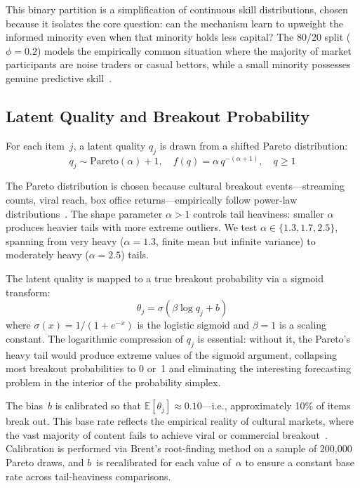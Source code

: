 \documentclass[conference]{IEEEtran}
\begin{document}
This binary partition is a simplification of continuous skill distributions, chosen because it isolates the core question: can the mechanism learn to upweight the informed minority even when that minority holds less capital? The 80/20 split ($\phi = 0.2$) models the empirically common situation where the majority of market participants are noise traders or casual bettors, while a small minority possesses genuine predictive skill~\cite{mellers2015,atanasov2017}.

\subsection{Latent Quality and Breakout Probability}
\label{sec:model-quality}

For each item~$j$, a latent quality $q_j$ is drawn from a shifted Pareto distribution:
\begin{equation}
    q_j \sim \text{Pareto}(\alpha) + 1, \quad f(q) = \alpha \, q^{-(\alpha+1)}, \quad q \geq 1
\end{equation}

The Pareto distribution is chosen because cultural breakout events---streaming counts, viral reach, box office returns---empirically follow power-law distributions~\cite{elberse2013,shapiro2023}. The shape parameter $\alpha > 1$ controls tail heaviness: smaller $\alpha$ produces heavier tails with more extreme outliers. We test $\alpha \in \{1.3, 1.7, 2.5\}$, spanning from very heavy ($\alpha = 1.3$, finite mean but infinite variance) to moderately heavy ($\alpha = 2.5$) tails.

The latent quality is mapped to a true breakout probability via a sigmoid transform:
\begin{equation}
    \theta_j = \sigma(\beta \log q_j + b)
\end{equation}
where $\sigma(x) = 1/(1 + e^{-x})$ is the logistic sigmoid and $\beta = 1$ is a scaling constant. The logarithmic compression of $q_j$ is essential: without it, the Pareto's heavy tail would produce extreme values of the sigmoid argument, collapsing most breakout probabilities to 0 or~1 and eliminating the interesting forecasting problem in the interior of the probability simplex.

The bias~$b$ is calibrated so that $\mathbb{E}[\theta_j] \approx 0.10$---i.e., approximately 10\% of items break out. This base rate reflects the empirical reality of cultural markets, where the vast majority of content fails to achieve viral or commercial breakout~\cite{elberse2013}. Calibration is performed via Brent's root-finding method on a sample of 200,000 Pareto draws, and $b$~is recalibrated for each value of~$\alpha$ to ensure a constant base rate across tail-heaviness comparisons.
\end{document}
